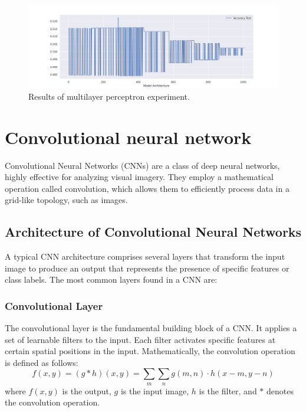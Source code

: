 \begin{figure}[h!]
	\includegraphics[width=\linewidth]{"pictures/mlp_res.png"}
	\caption{Results of multilayer perceptron experiment.}
	\label{fig:mlp}

\end{figure}


























\section{Convolutional neural network}
Convolutional Neural Networks (CNNs) \cite{convolutional_neural_network} are a class of deep neural networks, highly effective for analyzing visual imagery. They employ a mathematical operation called convolution, which allows them to efficiently process data in a grid-like topology, such as images.

\subsection{Architecture of Convolutional Neural Networks}
A typical CNN architecture comprises several layers that transform the input image to produce an output that represents the presence of specific features or class labels. The most common layers found in a CNN are:

\subsubsection{Convolutional Layer}
The convolutional layer is the fundamental building block of a CNN. It applies a set of learnable filters to the input. Each filter activates specific features at certain spatial positions in the input. Mathematically, the convolution operation is defined as follows:
\[f(x, y) = (g * h)(x, y) = \sum_m\sum_n g(m,n) \cdot h(x-m, y-n)\]
where \(f(x, y)\) is the output, \(g\) is the input image, \(h\) is the filter, and \(*\) denotes the convolution operation.

